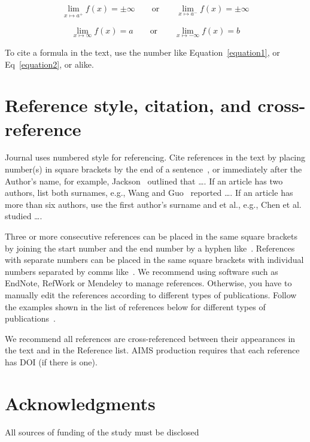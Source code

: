 \documentclass{aims}
\numberwithin{equation}{section}
\begin{document}
\begin{equation}
\lim_{x \mapsto a^+ }f\left ( x \right )= \pm \infty \qquad \text{or} \qquad \lim_{x \mapsto a^- }f\left ( x \right )= \pm \infty
\label{equation1}
\end{equation}

\begin{equation}
\lim_{x \mapsto \infty }f\left ( x \right )=  a \qquad \text{or} \qquad \lim_{x \mapsto -\infty}f\left ( x \right )=  b
\label{equation2}
\end{equation}

To cite a formula in the text, use the number like Equation~\ref{equation1}, or Eq~\ref{equation2}, or alike.



\section{Reference style, citation, and cross-reference}
Journal uses numbered style for referencing. Cite references in the text by placing number(s) in square brackets by the end of a sentence~\cite{A1,A2}, or immediately after the Author’s name, for example, Jackson~\cite{A3} outlined that …. If an article has two authors, list both surnames, e.g., Wang and Guo~\cite{A4} reported …. If an article has more than six authors, use the first author’s surname and et al., e.g., Chen et al.~\cite{A9} studied ….

Three or more consecutive references can be placed in the same square brackets by joining the start number and the end number by a hyphen like~\cite{A5,A6,A7,A8}. References with separate numbers can be placed in the same square brackets with individual numbers separated by comms like~\cite{A2,A6,A9}. We recommend using software such as EndNote, RefWork or Mendeley to manage references. Otherwise, you have to manually edit the references according to different types of publications. Follow the examples shown in the list of references below for different types of publications~\cite{A10,A11,A12}.

We recommend all references are cross-referenced between their appearances in the text and in the Reference list. AIMS production requires that each reference has DOI (if there is one).

\section*{Acknowledgments}

All sources of funding of the study must be disclosed
\end{document}
